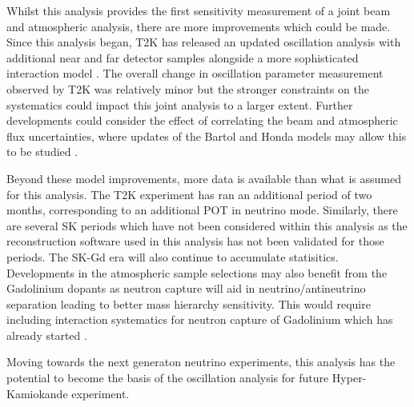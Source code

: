Whilst this analysis provides the first sensitivity measurement of a joint beam and atmospheric analysis, there are more improvements which could be made. Since this analysis began, T2K has released an updated oscillation analysis with additional near and far detector samples alongside a more sophisticated interaction model \cite{Bronner2022-wd}. The overall change in oscillation parameter measurement observed by T2K was relatively minor but the stronger constraints on the systematics could impact this joint analysis to a larger extent.
Further developments could consider the effect of correlating the beam and atmospheric flux uncertainties, where updates of the Bartol and Honda models may allow this to be studied \cite{Sato2022-ss}.

Beyond these model improvements, more data is available than what is assumed for this analysis. The T2K experiment has ran an additional period of two months, corresponding to an additional POT in neutrino mode. Similarly, there are several SK periods which have not been considered within this analysis as the reconstruction software used in this analysis has not been validated for those periods. The SK-Gd era will also continue to accumulate statisitics. Developments in the atmospheric sample selections may also benefit from the Gadolinium dopants as neutron capture will aid in neutrino/antineutrino separation leading to better mass hierarchy sensitivity. This would require including interaction systematics for neutron capture of Gadolinium which has already started \cite{10.48550/arxiv.2209.08609}.

Moving towards the next generaton neutrino experiments, this analysis has the potential to become the basis of the oscillation analysis for future Hyper-Kamiokande experiment.



